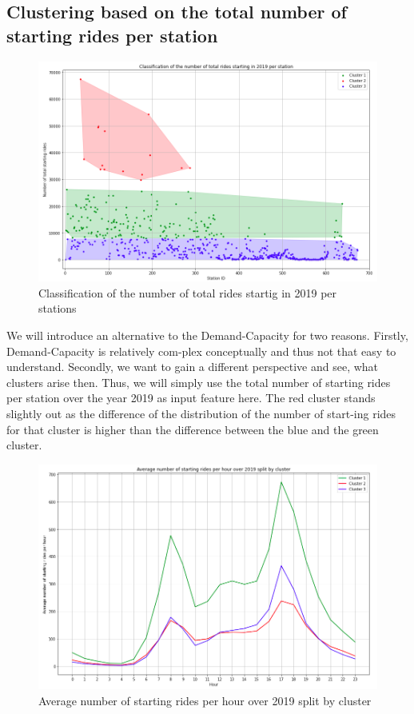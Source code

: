\subsection*{Clustering based on the total number of starting rides per station}
\label{app:A7}

\begin{figure}[H]
   \centering
    \includegraphics[width=0.8\linewidth]{./Figures/BC_APP10.png}
    \caption{Classification of the number of total rides startig in 2019 per stations}
    \label{BCAPP10}
\end{figure}

We will introduce an alternative to the Demand-Capacity for two reasons. Firstly, Demand-Capacity is relatively com-plex conceptually and thus not that easy to understand. Secondly, we want to gain a different perspective and see, what clusters arise then. Thus, we will simply use the total number of starting rides per station over the year 2019 as input feature here.
The red cluster stands slightly out as the difference of the distribution of the number of start-ing rides for that cluster is higher than the difference between the blue and the green cluster.

\begin{figure}[H]
   \centering
    \includegraphics[width=0.8\linewidth]{./Figures/BC_APP11.png}
    \caption{Average number of starting rides per hour over 2019 split by cluster}
    \label{BCAPP11}
\end{figure}

